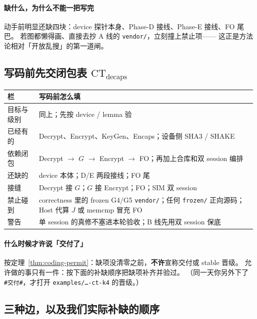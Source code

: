 \documentclass[UTF8,a4paper,11pt]{ctexart}
\theoremstyle{definition}
\theoremstyle{plain}
\theoremstyle{remark}
\numberwithin{figure}{section}
\numberwithin{table}{section}
\begin{document}
\paragraph{缺什么，为什么不能一把写完}
动手前明显还缺四块：device 探针本身、Phase-D 接线、Phase-E 接线、FO 尾巴。
若图都懒得画、直接去抄 A 线的 \texttt{vendor/}，立刻撞上禁止项——
这正是方法论相对「开放乱搜」的第一道闸。

\subsection{写码前先交闭包表 $\mathrm{CT}_{\mathrm{decaps}}$}
\label{sec:forward-ct}

\begin{center}
\small
\begin{tabular}{@{}L{2.8cm}L{11.0cm}@{}}
  \toprule
  栏 & 写码前怎么填 \\
  \midrule
  目标与级别 &
  同上；先按 device / lemma 验 \\
  已经有的 &
  Decrypt、Encrypt、KeyGen、Encaps；设备侧 SHA3 / SHAKE \\
  依赖闭包 &
  Decrypt $\to$ $G$ $\to$ Encrypt $\to$ FO；再加上合库和双 session 编排 \\
  还缺的 &
  device 本体；D/E 两段接线；FO 尾 \\
  接缝 &
  Decrypt 接 $G$；$G$ 接 Encrypt；FO；SIM 双 session \\
  禁止碰到 &
  correctness 里的 frozen G4/G5 \texttt{vendor/}；任何 \texttt{frozen/} 正向源码；
  Host 代算 $J$ 或 memcmp 冒充 FO \\
  警告 &
  单 session 的真修不塞进本轮验收；B 线先用双 session 保底 \\
  \bottomrule
\end{tabular}
\end{center}

\paragraph{什么时候才许说「交付了」}
按定理~\ref{thm:coding-permit}：缺项没清零之前，\textbf{不许}宣称交付或 stable 晋级。
允许做的事只有一件：按下面的补缺顺序把缺项补齐并验过。
（同一天你另外下了 \texttt{\#交付\#}，才打开 \texttt{examples/…-ct-k4} 的晋级。）

\subsection{三种边，以及我们实际补缺的顺序}
\label{sec:forward-fill}
\end{document}
